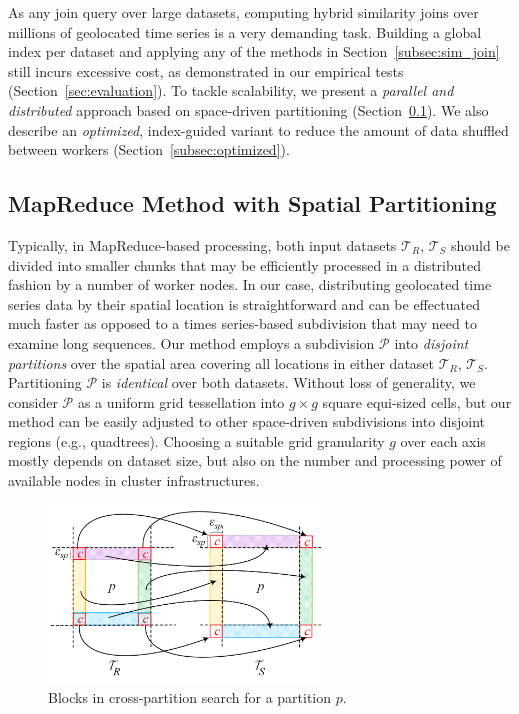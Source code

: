 As any join query over large datasets, computing hybrid similarity joins over millions of geolocated time series is a very demanding task. Building a global index per dataset and applying any of the methods in Section~\ref{subsec:sim_join} still incurs excessive cost, as demonstrated in our empirical tests (Section~\ref{sec:evaluation}). To tackle scalability, we present a {\em parallel and distributed} approach based on space-driven partitioning (Section~\ref{subsec:partitioned}). We also describe an {\em optimized}, index-guided variant to reduce the amount of data shuffled between workers (Section~\ref{subsec:optimized}).

\subsection{MapReduce Method with Spatial Partitioning}
\label{subsec:partitioned}

Typically, in MapReduce-based processing, both input datasets $\mathcal{T}_{R}$, $\mathcal{T}_{S}$ should be divided into smaller chunks that may be efficiently processed in a distributed fashion by a number of worker nodes. In our case, distributing geolocated time series data by their spatial location is straightforward and can be effectuated much faster as opposed to a times series-based subdivision that may need to examine long sequences. Our method employs a subdivision $\mathcal{P}$ into {\em disjoint partitions} over the spatial area covering all locations in either dataset $\mathcal{T}_{R}$, $\mathcal{T}_{S}$. Partitioning $\mathcal{P}$ is {\em identical} over both datasets. Without loss of generality, we consider $\mathcal{P}$ as a uniform grid tessellation into $g \times g$ square equi-sized cells, but our method can be easily adjusted to other space-driven subdivisions into disjoint regions (e.g., quadtrees). Choosing a suitable grid granularity $g$ over each axis mostly depends on dataset size, but also on the number and processing power of available nodes in cluster infrastructures.

\begin{figure}[!ht]
 \centering
 \includegraphics[width=0.65\textwidth]{figures/grid_exchange_slices.png}
 \caption{Blocks in cross-partition search for a partition $p$.}
 \label{fig:blocks}
\end{figure}

